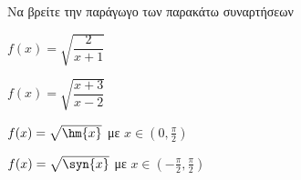 Να βρείτε την παράγωγο των παρακάτω συναρτήσεων
\begin{multicols}{2}
\begin{alist}
\item $ f(x)=\sqrt{\dfrac{2}{x+1}} $
\item $ f(x)=\sqrt{\dfrac{x+3}{x-2}} $
\item $ f(x)=\sqrt{\hm{x}} $ με $ x\in\left(0,\frac{\pi}{2}\right) $
\item $ f(x)=\sqrt{\syn{x}} $ με $ x\in\left(-\frac{\pi}{2},\frac{\pi}{2}\right) $
\end{alist}
\end{multicols}

